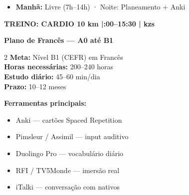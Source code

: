 \documentclass[a4paper,11pt]{article}
\newcommand{\faLanguage}{[FR]}
\newcommand{\mysection}[1]{%
  \vspace{16pt}
  \noindent\colorbox{dark}{\parbox{\linewidth}{\color{white}\large\bfseries\quad #1}}
  \vspace{8pt}\par
}
\newcommand{\badge}[2]{%
  \colorbox{#1}{\color{white}\footnotesize\textbf{\strut\;#2\;}}%
}
\begin{document}
\vspace{6pt}

\begin{tcolorbox}[daybox, title={\badge{cardio}{DOMINGO} \quad CARDIO DAY}]
  \begin{itemize}[leftmargin=1em, itemsep=2pt]
    \item \textbf{Manhã:} Livre (7h--14h) · Noite: Planeamento + Anki
  \end{itemize}
  \vspace{4pt}
  \begin{tcolorbox}[enhanced, colback=cardio!10, colframe=cardio, sharp corners, boxrule=1pt, left=5pt]
    \textbf{TREINO: CARDIO 10 km \;|:00--15:30 \;| kzs}
  \end{tcolorbox}
\end{tcolorbox}

\newpage

\mysection{Plano de Francês — A0 até B1}

\vspace{6pt}

\begin{tcolorbox}[enhanced, colback=mid!90, colframe=light, coltext=white, sharp corners, title={\faLanguage\quad Roteiro Linguístico 2026}, fonttitle=\bfseries\large]
  \begin{multicols}{2}
    \textbf{Meta:} Nível B1 (CEFR) em Francês\\
    \textbf{Horas necessárias:} 200--240 horas\\
    \textbf{Estudo diário:} 45--60 min/dia\\
    \textbf{Prazo:} 10--12 meses

    \columnbreak

    \textbf{Ferramentas principais:}
    \begin{itemize}[leftmargin=1em, itemsep=1pt]
      \item Anki — cartões Spaced Repetition
      \item Pimsleur / Assimil — input auditivo
      \item Duolingo Pro — vocabulário diário
      \item RFI / TV5Monde — imersão real
      \item iTalki — conversação com nativos
    \end{itemize}
  \end{multicols}
\end{tcolorbox}
\end{document}

